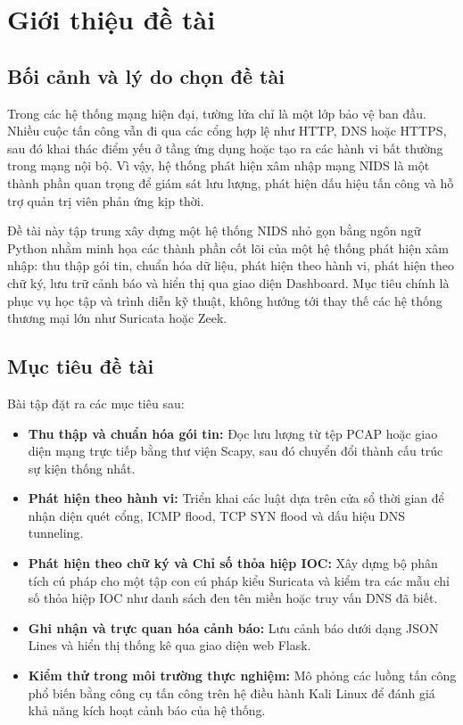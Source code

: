 \chapter{Giới thiệu đề tài}

\section{Bối cảnh và lý do chọn đề tài}
Trong các hệ thống mạng hiện đại, tường lửa chỉ là một lớp bảo vệ ban đầu. Nhiều cuộc tấn công vẫn đi qua các cổng hợp lệ như HTTP, DNS hoặc HTTPS, sau đó khai thác điểm yếu ở tầng ứng dụng hoặc tạo ra các hành vi bất thường trong mạng nội bộ. Vì vậy, hệ thống phát hiện xâm nhập mạng NIDS là một thành phần quan trọng để giám sát lưu lượng, phát hiện dấu hiệu tấn công và hỗ trợ quản trị viên phản ứng kịp thời.

Đề tài này tập trung xây dựng một hệ thống NIDS nhỏ gọn bằng ngôn ngữ Python nhằm minh họa các thành phần cốt lõi của một hệ thống phát hiện xâm nhập: thu thập gói tin, chuẩn hóa dữ liệu, phát hiện theo hành vi, phát hiện theo chữ ký, lưu trữ cảnh báo và hiển thị qua giao diện Dashboard. Mục tiêu chính là phục vụ học tập và trình diễn kỹ thuật, không hướng tới thay thế các hệ thống thương mại lớn như Suricata hoặc Zeek.

\section{Mục tiêu đề tài}
Bài tập đặt ra các mục tiêu sau:
\begin{itemize}
    \item \textbf{Thu thập và chuẩn hóa gói tin:} Đọc lưu lượng từ tệp PCAP hoặc giao diện mạng trực tiếp bằng thư viện Scapy, sau đó chuyển đổi thành cấu trúc sự kiện thống nhất.
    \item \textbf{Phát hiện theo hành vi:} Triển khai các luật dựa trên cửa sổ thời gian để nhận diện quét cổng, ICMP flood, TCP SYN flood và dấu hiệu DNS tunneling.
    \item \textbf{Phát hiện theo chữ ký và Chỉ số thỏa hiệp IOC:} Xây dựng bộ phân tích cú pháp cho một tập con cú pháp kiểu Suricata và kiểm tra các mẫu chỉ số thỏa hiệp IOC như danh sách đen tên miền hoặc truy vấn DNS đã biết.
    \item \textbf{Ghi nhận và trực quan hóa cảnh báo:} Lưu cảnh báo dưới dạng JSON Lines và hiển thị thống kê qua giao diện web Flask.
    \item \textbf{Kiểm thử trong môi trường thực nghiệm:} Mô phỏng các luồng tấn công phổ biến bằng công cụ tấn công trên hệ điều hành Kali Linux để đánh giá khả năng kích hoạt cảnh báo của hệ thống.
\end{itemize}


